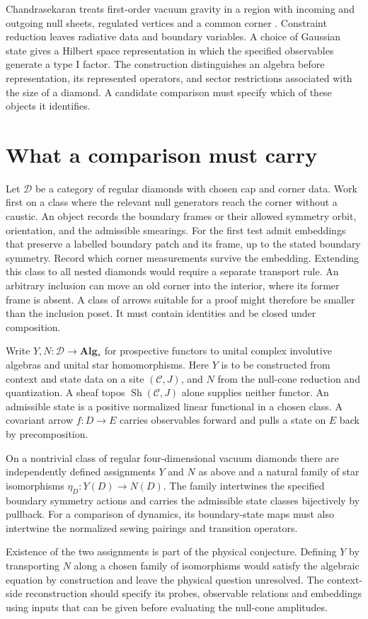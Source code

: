 \documentclass[11pt,letterpaper]{article}
\begin{document}
Chandrasekaran treats first-order vacuum gravity in a region with incoming and outgoing null sheets, regulated vertices and a common corner \cite[Secs.~3--4]{nc}. Constraint reduction leaves radiative data and boundary variables. A choice of Gaussian state gives a Hilbert space representation in which the specified observables generate a type I factor. The construction distinguishes an algebra before representation, its represented operators, and sector restrictions associated with the size of a diamond. A candidate comparison must specify which of these objects it identifies.

\section{What a comparison must carry}
Let $\mathcal D$ be a category of regular diamonds with chosen cap and corner data. Work first on a class where the relevant null generators reach the corner without a caustic. An object records the boundary frames or their allowed symmetry orbit, orientation, and the admissible smearings. For the first test admit embeddings that preserve a labelled boundary patch and its frame, up to the stated boundary symmetry. Record which corner measurements survive the embedding. Extending this class to all nested diamonds would require a separate transport rule. An arbitrary inclusion can move an old corner into the interior, where its former frame is absent. A class of arrows suitable for a proof might therefore be smaller than the inclusion poset. It must contain identities and be closed under composition.

Write $Y,N:\mathcal D\to\mathbf{Alg}_*$ for prospective functors to unital complex involutive algebras and unital star homomorphisms. Here $Y$ is to be constructed from context and state data on a site $(\mathcal C,J)$, and $N$ from the null-cone reduction and quantization. A sheaf topos $\operatorname{Sh}(\mathcal C,J)$ alone supplies neither functor. An admissible state is a positive normalized linear functional in a chosen class. A covariant arrow $f:D\to E$ carries observables forward and pulls a state on $E$ back by precomposition.

\begin{conjecture}
On a nontrivial class of regular four-dimensional vacuum diamonds there are independently defined assignments $Y$ and $N$ as above and a natural family of star isomorphisms $\eta_D:Y(D)\to N(D)$. The family intertwines the specified boundary symmetry actions and carries the admissible state classes bijectively by pullback. For a comparison of dynamics, its boundary-state maps must also intertwine the normalized sewing pairings and transition operators.
\end{conjecture}
Existence of the two assignments is part of the physical conjecture. Defining $Y$ by transporting $N$ along a chosen family of isomorphisms would satisfy the algebraic equation by construction and leave the physical question unresolved. The context-side reconstruction should specify its probes, observable relations and embeddings using inputs that can be given before evaluating the null-cone amplitudes.
\end{document}
